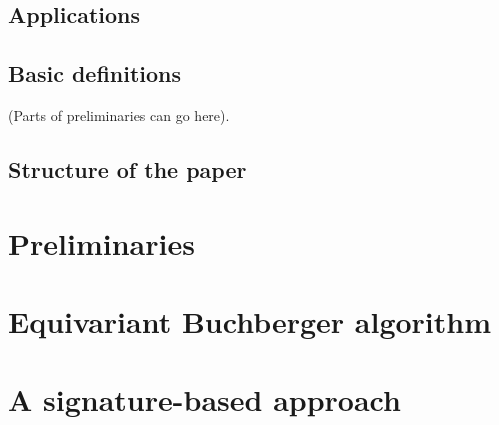 \documentclass[11pt]{amsart}
\theoremstyle{definition}
\theoremstyle{remark}
\numberwithin{equation}{section}
\begin{document}


\subsection{Applications}



 
\subsection{Basic definitions}

(Parts of preliminaries can go here).



\subsection{Structure of the paper}

\section{Preliminaries}



\section{Equivariant Buchberger algorithm}



\section{A signature-based approach}\label{sec:signature}





\end{document}
